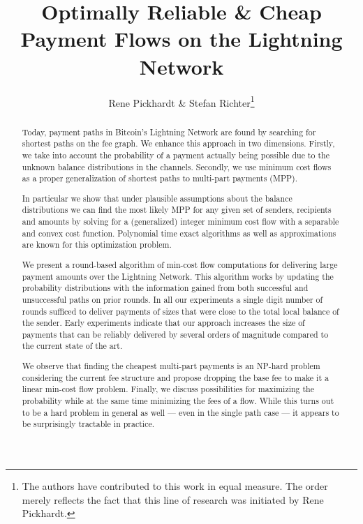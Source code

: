 \documentclass[10pt,twocolumn]{article}
\title{Optimally Reliable \& Cheap Payment Flows on the Lightning Network}
\author{Rene Pickhardt \& Stefan Richter\thanks{The authors have contributed to this work in equal measure. The order merely reflects the fact that this line of research was initiated by Rene Pickhardt.}}
\begin{document}
 
\maketitle






 
\begin{abstract}
  Today, payment paths in Bitcoin's Lightning Network are found by searching for shortest paths on the fee graph.
  We enhance this approach in two
  dimensions. Firstly, we take into account the probability of a payment
  actually being possible due to the unknown balance distributions in the
  channels. Secondly, we use minimum cost flows as a proper generalization of
  shortest paths to multi-part payments (MPP).

  In particular we show that under plausible assumptions about the balance
  distributions we can find the most likely MPP for any given set of senders, recipients and amounts by solving for a (generalized) integer
  minimum cost flow with a separable and convex cost function. Polynomial time
  exact algorithms as well as approximations are known for this optimization
  problem.
  

  We present a round-based algorithm of min-cost flow computations for
  delivering large payment amounts over the Lightning Network. This algorithm
  works by updating the probability distributions with the information gained
  from both successful and unsuccessful paths on prior rounds. In all our
  experiments a single digit number of rounds sufficed to deliver payments 
  of sizes that were close to the total local balance of the sender.
  Early experiments indicate that our approach increases the size of payments that can be reliably delivered by several orders of magnitude compared to the current state of the art.

  We observe that finding the cheapest multi-part payments is an NP-hard problem
  considering the current fee structure and propose dropping the base fee to make
  it a linear min-cost flow problem. Finally, we discuss possibilities for
  maximizing the probability while at the same time minimizing the fees of a
  flow. While this turns out to be a hard problem in general as well --- even in
  the single path case --- it appears to be surprisingly tractable in practice.
  
\end{abstract}

\end{document}
